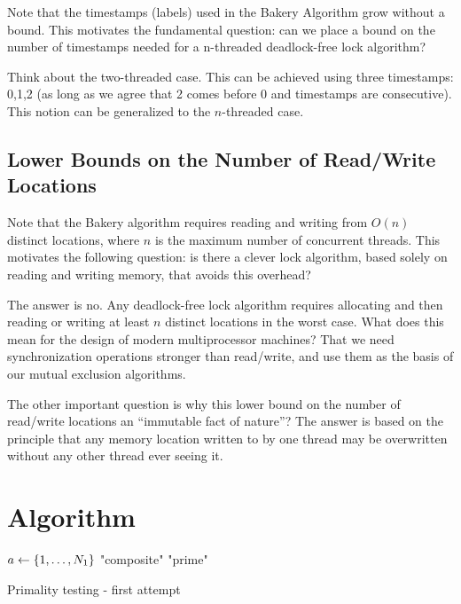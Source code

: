 Note that the timestamps (labels) used in the Bakery Algorithm grow without a bound. This motivates the fundamental question: can we place a bound on the number of timestamps needed for a n-threaded deadlock-free lock algorithm?

Think about the two-threaded case. This can be achieved using three timestamps: 0,1,2 (as long as we agree that 2 comes before 0 and timestamps are consecutive). This notion can be generalized to the $n$-threaded case.

\subsection{Lower Bounds on the Number of Read/Write Locations}

Note that the Bakery algorithm requires reading and writing from $O(n)$ distinct locations, where $n$ is the maximum number of concurrent threads. This motivates the following question: is there a clever lock algorithm, based solely on reading and writing memory, that avoids this overhead?

The answer is no. Any deadlock-free lock algorithm requires allocating and then reading or writing at least $n$ distinct locations in the worst case. What does this mean for the design of modern multiprocessor machines? That we need synchronization operations stronger than read/write, and use them as the basis of our mutual exclusion algorithms.

The other important question is why this lower bound on the number of read/write locations an ``immutable fact of nature''? The answer is based on the principle that any memory location written to by one thread may be overwritten without any other thread ever seeing it.



\section{Algorithm}
\begin{algorithm}[H]
    \BlankLine
     {
        $a\leftarrow \qty{1,\dots,N_1}$\;
    {\Return "composite"}
    }
    \Return "prime"
    \caption{Primality testing - first attempt}
    \label{alg:miller_rabin}
\end{algorithm}


